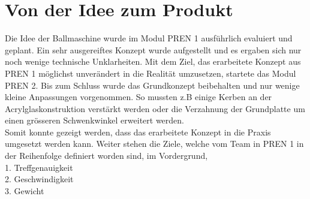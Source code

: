 \section{Von der Idee zum Produkt}

Die Idee der Ballmaschine wurde im Modul PREN 1 ausführlich evaluiert und geplant. 
Ein sehr ausgereiftes Konzept wurde aufgestellt und es ergaben sich nur noch wenige 
technische Unklarheiten. Mit dem Ziel, das erarbeitete Konzept aus PREN 1 möglichst 
unverändert in die Realität umzusetzen, startete das Modul PREN 2. \newline
Bis zum Schluss wurde das Grundkonzept beibehalten und nur wenige kleine Anpassungen 
vorgenommen. So mussten z.B einige Kerben an der Acrylglaskonstruktion verstärkt werden
oder die Verzahnung der Grundplatte um einen grösseren Schwenkwinkel erweitert werden. \\
Somit konnte gezeigt werden, dass das erarbeitete Konzept in die Praxis umgesetzt 
werden kann. Weiter stehen die Ziele, welche vom Team in PREN 1 in der Reihenfolge definiert 
worden sind, im Vordergrund, \\

1. Treffgenauigkeit \\
2. Geschwindigkeit \\
3. Gewicht \\